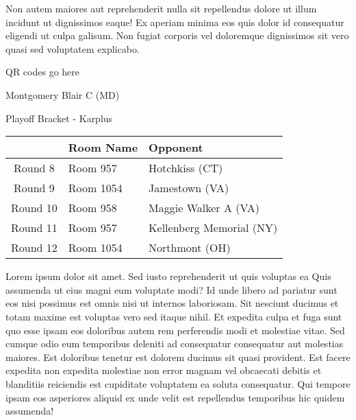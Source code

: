 \documentclass{article}%
\begin{document}
\newline%
Non autem maiores aut reprehenderit nulla sit repellendus dolore ut illum incidunt ut dignissimos eaque! Ex aperiam minima eos quis dolor id consequatur eligendi ut culpa galisum. Non fugiat corporis vel doloremque dignissimos sit vero quasi sed voluptatem explicabo.\newline%
\newline%
%
\vspace*{30pt}%
\begin{center}%
\begin{Huge}%
QR codes go here%
\end{Huge}%
\end{center}%
\newpage%
\begin{center}%
\begin{Huge}%
Montgomery Blair C (MD)%
\end{Huge}%
\vspace*{8pt}%
\linebreak%
\begin{Large}%
Playoff Bracket {-} Karplus%
\end{Large}%
\end{center}%
\begin{tabularx}{\textwidth}{|c|Y|Y|}%
\hline%
&Room Name&Opponent\\%
\hline%
Round 8&Room 957&Hotchkiss (CT)\\%
Round 9&Room 1054&Jamestown (VA)\\%
Round 10&Room 958&Maggie Walker A (VA)\\%
Round 11&Room 957&Kellenberg Memorial (NY)\\%
Round 12&Room 1054&Northmont (OH)\\%
\hline%
\end{tabularx}%
\vspace*{8pt}%
\linebreak%
\newline%
\newline%
Lorem ipsum dolor sit amet. Sed iusto reprehenderit ut quis voluptas ea Quis assumenda ut eius magni eum voluptate modi? Id unde libero ad pariatur sunt eos nisi possimus est omnis nisi ut internos laboriosam. Sit nesciunt ducimus et totam maxime est voluptas vero sed itaque nihil. Et expedita culpa et fuga sunt quo esse ipsam eos doloribus autem rem perferendis modi et molestiae vitae.\newline%
\newline%
Sed cumque odio eum temporibus deleniti ad consequatur consequatur aut molestias maiores. Est doloribus tenetur est dolorem ducimus sit quasi provident. Est facere expedita non expedita molestiae non error magnam vel obcaecati debitis et blanditiis reiciendis est cupiditate voluptatem ea soluta consequatur. Qui tempore ipsam eos asperiores aliquid ex unde velit est repellendus temporibus hic quidem assumenda!\newline%
\end{document}
